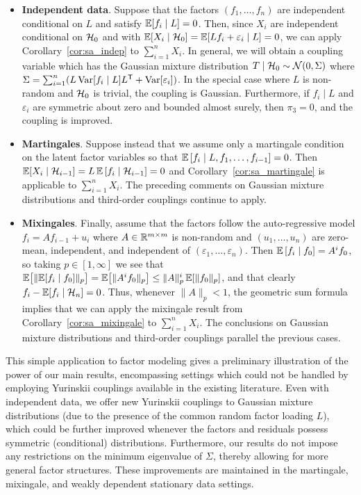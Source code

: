 \begin{itemize}
  \item \textbf{Independent data}.
    Suppose that the factors $(f_1, \ldots,
    f_n)$ are independent conditional on $L$ and satisfy
    $\mathbb{E} [ f_i \mid L ] = 0$.
    Then, since $X_i$ are independent conditional on $\mathcal{H}_0$ and with
    $\mathbb{E} [ X_i \mid \mathcal{H}_0 ] = \mathbb{E} [ L f_i + \varepsilon_i \mid L ] = 0$,
    we can apply Corollary~\ref{cor:sa_indep} to $\sum_{i=1}^n X_i$.
    In general, we will obtain a coupling variable which has the Gaussian
    mixture distribution $T \mid \mathcal{H}_0 \sim \mathcal{N}(0, \Sigma)$ where
    $\Sigma= \sum_{i=1}^n (L\operatorname{Var}[f_i \mid L]L^{\mathsf{T}} +\operatorname{Var}[\varepsilon_i])$.
    In the special case where $L$ is non-random
    and $\mathcal{H}_0$ is trivial, the coupling is Gaussian. Furthermore,
    if $f_i\mid L$ and $\varepsilon_i$ are symmetric about zero
    and bounded almost surely, then $\pi_3=0$, and the coupling is improved.

  \item \textbf{Martingales}.
    Suppose instead that we assume only a martingale
    condition on the latent factor variables so that
    $\mathbb{E} \left[ f_i \mid L, f_1, \ldots, f_{i-1} \right] = 0$.
    Then $\mathbb{E} [ X_i \mid \mathcal{H}_{i-1} ]
    = L\, \mathbb{E} \left[ f_i \mid \mathcal{H}_{i-1} \right] = 0$
    and Corollary~\ref{cor:sa_martingale} is applicable to $\sum_{i=1}^n X_i$.
    The preceding comments on Gaussian mixture distributions
    and third-order couplings continue to apply.

  \item \textbf{Mixingales}.
    Finally, assume that the factors follow the
    auto-regressive model $f_i = A f_{i-1} + u_i$ where
    $A \in \mathbb{R}^{m \times m}$ is non-random and $(u_1, \ldots, u_n)$ are
    zero-mean, independent, and independent of
    $(\varepsilon_1, \ldots, \varepsilon_n)$.
    Then $\mathbb{E} \left[ f_i \mid f_0 \right] = A^i f_0$, so taking
    $p \in [1, \infty]$ we see that
    $\mathbb{E} \big[ \| \mathbb{E} [ f_i \mid f_0 ] \|_p \big]
    = \mathbb{E} \big[ \| A^i f_0 \|_p \big] \leq \|A\|_p^i\,\mathbb{E} [ \|f_0\|_p ]$,
    and that clearly $f_i - \mathbb{E} [ f_i \mid \mathcal{H}_n ] = 0$.
    Thus, whenever $\|A\|_p < 1$, the geometric sum formula implies that
    we can apply the mixingale result from Corollary~\ref{cor:sa_mixingale} to
    $\sum_{i=1}^n X_i$. The conclusions on Gaussian mixture distributions
    and third-order couplings parallel the previous cases.
\end{itemize}

This simple application to factor modeling gives a preliminary illustration of
the power of our main results, encompassing settings which could not be handled
by employing Yurinskii couplings available in the existing literature. Even
with independent data, we offer new Yurinskii couplings to Gaussian mixture
distributions (due to the presence of the common random factor loading $L$),
which could be further improved whenever the factors and residuals possess
symmetric (conditional) distributions. Furthermore, our results do not impose
any restrictions on the minimum eigenvalue of $\Sigma$, thereby allowing for
more general factor structures. These improvements are maintained in the
martingale, mixingale, and weakly dependent stationary data settings.

